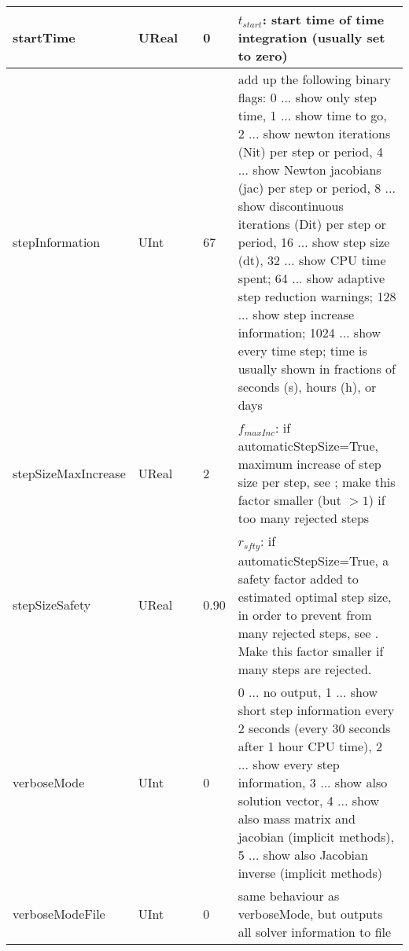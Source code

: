 \begin{center}
\begin{longtable}{| p{4.2cm} | p{2.5cm} | p{0.3cm} | p{3.0cm} | p{6cm} |}
    startTime &     UReal &      &     0 &     $t_{start}$: start time of time integration (usually set to zero)\\ \hline
    stepInformation &     UInt &      &     67 &     add up the following binary flags: 0 ... show only step time, 1 ... show time to go, 2 ... show newton iterations (Nit) per step or period, 4 ... show Newton jacobians (jac) per step or period, 8 ... show discontinuous iterations (Dit) per step or period, 16 ... show step size (dt), 32 ... show CPU time spent; 64 ... show adaptive step reduction warnings; 128 ... show step increase information; 1024 ... show every time step; time is usually shown in fractions of seconds (s), hours (h), or days\\ \hline
    stepSizeMaxIncrease &     UReal &      &     2 &     $f_{maxInc}$: if automaticStepSize=True, maximum increase of step size per step, see {sec:ExplicitSolver}; make this factor smaller (but $> 1$) if too many rejected steps\\ \hline
    stepSizeSafety &     UReal &      &     0.90 &     $r_{sfty}$: if automaticStepSize=True, a safety factor added to estimated optimal step size, in order to prevent from many rejected steps, see {sec:ExplicitSolver}. Make this factor smaller if many steps are rejected.\\ \hline
    verboseMode &     UInt &      &     0 &     0 ... no output, 1 ... show short step information every 2 seconds (every 30 seconds after 1 hour CPU time), 2 ... show every step information, 3 ... show also solution vector, 4 ... show also mass matrix and jacobian (implicit methods), 5 ... show also Jacobian inverse (implicit methods)\\ \hline
    verboseModeFile &     UInt &      &     0 &     same behaviour as verboseMode, but outputs all solver information to file\\ \hline
	  \end{longtable}
	\end{center}

